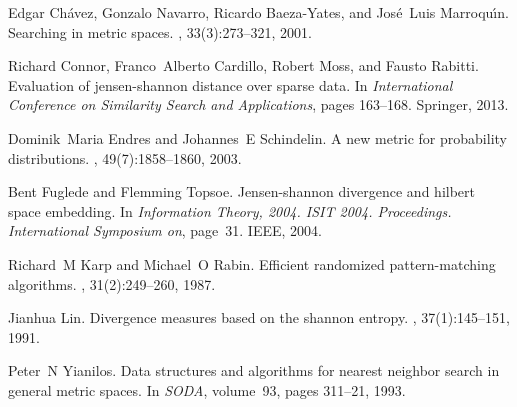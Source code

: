 \documentclass[10pt,letterpaper]{article}
\begin{document}
\begin{thebibliography}{1}

Edgar Ch{\'a}vez, Gonzalo Navarro, Ricardo Baeza-Yates, and Jos{\'e}~Luis
  Marroqu{\'\i}n.
\newblock Searching in metric spaces.
, 33(3):273--321, 2001.

Richard Connor, Franco~Alberto Cardillo, Robert Moss, and Fausto Rabitti.
\newblock Evaluation of jensen-shannon distance over sparse data.
\newblock In {\em International Conference on Similarity Search and
  Applications}, pages 163--168. Springer, 2013.

Dominik~Maria Endres and Johannes~E Schindelin.
\newblock A new metric for probability distributions.
, 49(7):1858--1860,
  2003.

Bent Fuglede and Flemming Topsoe.
\newblock Jensen-shannon divergence and hilbert space embedding.
\newblock In {\em Information Theory, 2004. ISIT 2004. Proceedings.
  International Symposium on}, page~31. IEEE, 2004.

Richard~M Karp and Michael~O Rabin.
\newblock Efficient randomized pattern-matching algorithms.
, 31(2):249--260, 1987.

Jianhua Lin.
\newblock Divergence measures based on the shannon entropy.
, 37(1):145--151, 1991.

Peter~N Yianilos.
\newblock Data structures and algorithms for nearest neighbor search in general
  metric spaces.
\newblock In {\em SODA}, volume~93, pages 311--21, 1993.

\end{thebibliography}
\end{document}
